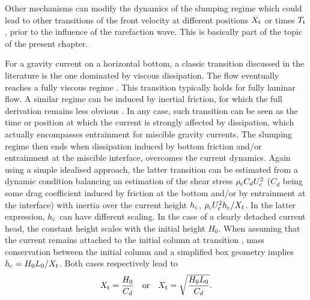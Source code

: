 \documentclass[12pt]{article}
\begin{document}
Other mechanisms can modify the dynamics of the slumping regime which could lead to other transitions of the front velocity at different positions $X_{\text t}$ or times $T_{\text t}$, prior to the influence of the rarefaction wave. This is basically part of the topic of the present chapter.

For a gravity current on a horizontal bottom, a classic transition discussed in the literature is the one dominated by viscous dissipation. The flow eventually reaches a fully viscous regime \citep{Huppert1980}. This transition typically holds for fully laminar flow. A similar regime can be induced by inertial friction, for which the full derivation remains less obvious \citep[see for instance][for the case of a constant-influx current]{Hogg2001}. In any case, such transition can be seen as the time or position at which the current is strongly affected by dissipation, which actually encompasses entrainment for miscible gravity currents. The slumping regime then ends when dissipation induced by bottom friction and/or entrainment at the miscible interface, overcomes the current dynamics.
%
Again using a simple idealised approach, the latter transition can be estimated from a dynamic condition balancing an estimation of the shear stress $\rho_{\text c} C_d U_{\text{c}}^2$ ($C_d$ being some drag coefficient induced by friction at the bottom and/or by entrainment at the interface) with inertia over the current height $h_{\text c}$, $\rho_{\text c} U_{\text{c}}^2 h_{\text c} /X_t$. In the latter expression, $h_{\text c}$ can have different scaling. In the case of a clearly detached current head, the constant height scales with the initial height $H_0$. When assuming that the current remains attached to the initial column at transition \citep[similarly to][but for inertial drag instead of viscous dissipation]{Bougouin2022}, mass conservation between the initial column and a simplified box geometry implies $h_{\text c} = H_0 L_0/X_t$.
%
Both cases respectively lead to
\begin{equation}
	\label{eq:Xt_drag}
	\displaystyle X_{\text t}= {\frac{H_0}{C_d}}\quad \mbox{or} \quad X_{\text t}=  \sqrt{\frac{H_0 L_0}{C_d}}.
\end{equation}
\end{document}
